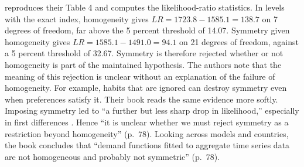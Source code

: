  reproduces their Table 4 and computes the likelihood-ratio statistics. In levels
with the exact index, homogeneity gives $LR = 1723.8 - 1585.1 = 138.7$ on 7 degrees of freedom, far
above the 5 percent threshold of 14.07. Symmetry given homogeneity gives $LR = 1585.1 - 1491.0 =
94.1$ on 21 degrees of freedom, against a 5 percent threshold of 32.67. Symmetry is therefore rejected whether
or not homogeneity is part of the maintained hypothesis. The authors note that the meaning of this
rejection is unclear without an explanation of the failure of homogeneity. For example, habits that are
ignored can destroy symmetry even when preferences satisfy it. Their book reads the same evidence more
softly. Imposing symmetry led to ``a further but less sharp drop in likelihood,'' especially in first
differences \citep[\S 3.4, p.~78]{DeatonMuellbauer1980b}. Hence ``it is unclear whether we must reject
symmetry as a restriction beyond homogeneity'' (p.~78). Looking across models and countries, the book concludes
that ``demand functions fitted to aggregate time series data are not homogeneous and probably not
symmetric'' (p.~78).

